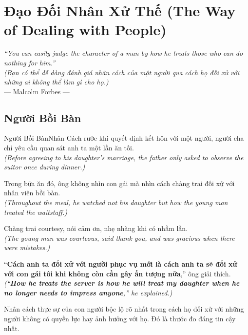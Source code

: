 \chapter{Đạo Đối Nhân Xử Thế (The Way of Dealing with People)}

\begin{center}
  \textit{\color{truyenblue}``You can easily judge the character of a man by how he treats those who can do nothing for him.''}\\
  \textit{(Bạn có thể dễ dàng đánh giá nhân cách của một người qua cách họ đối xử với những ai không thể làm gì cho họ.)}\\[4pt]
  \small\color{truyengold}--- Malcolm Forbes ---
\end{center}
\ngancach

\section{Người Bồi Bàn}
\begin{truyen}{Người Bồi Bàn}{Nhân Cách}
rước khi quyết định kết hôn với một người, người cha chỉ yêu cầu quan sát anh ta một lần ăn tối.\\
\textit{(Before agreeing to his daughter's marriage, the father only asked to observe the suitor once during dinner.)}

Trong bữa ăn đó, ông không nhìn con gái mà nhìn cách chàng trai đối xử với nhân viên bồi bàn.\\
\textit{(Throughout the meal, he watched not his daughter but how the young man treated the waitstaff.)}

Chàng trai courtesy, nói cảm ơn, nhẹ nhàng khi có nhầm lẫn.\\
\textit{(The young man was courteous, said thank you, and was gracious when there were mistakes.)}

``\textbf{Cách anh ta đối xử với người phục vụ mới là cách anh ta sẽ đối xử với con gái tôi khi không còn cần gây ấn tượng nữa},'' ông giải thích.\\
\textit{(``\textbf{How he treats the server is how he will treat my daughter when he no longer needs to impress anyone},'' he explained.)}
\end{truyen}
\begin{baihoc}
  Nhân cách thực sự của con người bộc lộ rõ nhất trong cách họ đối xử với những người không có quyền lực hay ảnh hưởng với họ. Đó là thước đo đáng tin cậy nhất.
\end{baihoc}

